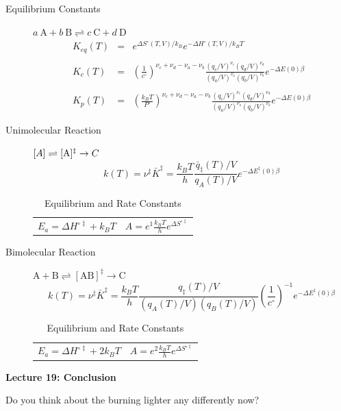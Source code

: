 \documentclass[11pt]{article}
\begin{document}
\begin{outline}
\begin{table} 
\begin{center}
    \caption{\large{Equilibrium and Rate Constants}}
   \begin{description}
   \item[Equilibrium Constants] $a~\text{A} + b~\text{B} \rightleftharpoons c~\text{C} + d~\text{D} $
     \begin{eqnarray*}
       K_{eq}(T) &=& e^{\Delta S^\circ(T,V)/k_B}e^{-\Delta H^\circ(T,V)/k_BT}
       \\ \\ 
            K_c(T) &=&
          \left(\frac{1}{c^\circ}\right)^{\nu_c+\nu_d-\nu_a-\nu_b}\frac{(q_c/V)^{\nu_c}(q_d/V)^{\nu_d}}{(q_a/V)^{\nu_a}(q_b/V)^{\nu_b}}e^{-\Delta
            E(0)\beta}\\ \\
            K_p(T) &=&
          \left(\frac{k_BT}{P^\circ}\right)^{\nu_c+\nu_d-\nu_a-\nu_b}\frac{(q_c/V)^{\nu_c}(q_d/V)^{\nu_d}}{(q_a/V)^{\nu_a}(q_b/V)^{\nu_b}}e^{-\Delta
            E(0)\beta}
\end{eqnarray*}
\item[Unimolecular Reaction] $\text[A] \rightleftharpoons [\text{A} ]^\ddagger
  \rightarrow C$
      \begin{displaymath}
        k(T)=\nu^\ddagger \bar K^\ddagger=\frac{k_B T}{h} \frac{\bar{q}_\ddagger(T)/V}{q_A(T)/V}
          e^{-\Delta E^\ddagger(0)\beta}               
      \end{displaymath}
\begin{center}
      \begin{tabular}{cc}
      $ \displaystyle E_a =\Delta H^{\circ\ddagger}+k_B T $
      & $ \displaystyle A = e^1\frac{k_B T}{h} e^{\Delta S^{\circ\ddagger}} $
      \end{tabular}
\end{center}
\item[Bimolecular Reaction] $
        \mathrm{A} + \mathrm{B} \rightleftharpoons [ \mathrm{AB}]^\ddagger
        \rightarrow \text{C}$
      \begin{displaymath}
        k(T)=\nu^\ddagger \bar K^\ddagger=\frac{k_B T}{h} \frac{q_\ddagger(T)/V}{(q_A(T)/V)(q_B(T)/V)}\left
          (\frac{1}{c^\circ}\right )^{-1}
        e^{-\Delta E^\ddagger(0)\beta}               
      \end{displaymath}
      \begin{center}
        \begin{tabular}{cc}
        $ \displaystyle E_a  =\Delta H^{\circ\ddagger}+2 k_B T $ & $ \displaystyle
        A  = e^2\frac{k_B T}{h} e^{\Delta S^{\circ\ddagger}} $
      \end{tabular}
      \end{center}
   \end{description}
 \end{center}
 \end{table}

\item {\bf Lecture 19: Conclusion}
  \begin{outline}
    \item Do you think about the burning lighter any differently now?  
  \end{outline}

\end{outline}
\end{document}
